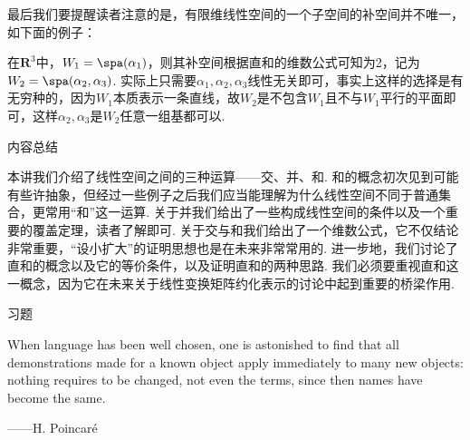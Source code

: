 最后我们要提醒读者注意的是，有限维线性空间的一个子空间的补空间并不唯一，如下面的例子：
\begin{example}
    在$\mathbf{R}^3$中，$W_1=\spa(\alpha_1)$，则其补空间根据直和的维数公式可知为2，记为$W_2=\spa(\alpha_2,\alpha_3)$. 实际上只需要$\alpha_1,\alpha_2,\alpha_3$线性无关即可，事实上这样的选择是有无穷种的，因为$W_1$本质表示一条直线，故$W_2$是不包含$W_1$且不与$W_1$平行的平面即可，这样$\alpha_2,\alpha_3$是$W_2$任意一组基都可以.
\end{example}

\vspace{2ex}
\centerline{\heiti \Large 内容总结}

本讲我们介绍了线性空间之间的三种运算——交、并、和. 和的概念初次见到可能有些许抽象，但经过一些例子之后我们应当能理解为什么线性空间不同于普通集合，更常用``和''这一运算. 关于并我们给出了一些构成线性空间的条件以及一个重要的覆盖定理，读者了解即可. 关于交与和我们给出了一个维数公式，它不仅结论非常重要，``设小扩大''的证明思想也是在未来非常常用的. 进一步地，我们讨论了直和的概念以及它的等价条件，以及证明直和的两种思路. 我们必须要重视直和这一概念，因为它在未来关于线性变换矩阵约化表示的讨论中起到重要的桥梁作用.

\vspace{2ex}
\centerline{\heiti \Large 习题}

\vspace{2ex}
When language has been well chosen, one is astonished to find that all demonstrations made for a known object apply immediately to many new objects: nothing requires to be changed, not even the terms, since then names have become the same.
\begin{flushright}
    ——H. Poincaré
\end{flushright}

